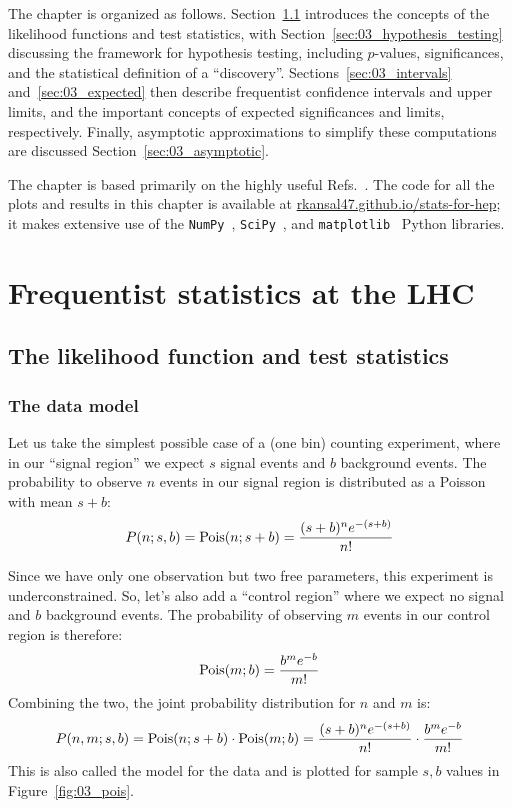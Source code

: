 The chapter is organized as follows.
Section~\ref{sec:03_likelihood} introduces the concepts of the likelihood functions and test statistics, with Section~\ref{sec:03_hypothesis_testing} discussing the framework for hypothesis testing, including $p$-values, significances, and the statistical definition of a ``discovery''.
Sections~\ref{sec:03_intervals} and~\ref{sec:03_expected} then describe frequentist confidence intervals and upper limits, and the important concepts of expected significances and limits, respectively.
Finally, asymptotic approximations to simplify these computations are discussed Section~\ref{sec:03_asymptotic}.

The chapter is based primarily on the highly useful Refs.~\cite{Cowan:2010js, Cranmer:2014lly}.
The code for all the plots and results in this chapter is available at \href{https://rkansal47.github.io/stats-for-hep}{rkansal47.github.io/stats-for-hep}; it makes extensive use of the \texttt{NumPy}~\cite{harris2020array}, \texttt{SciPy}~\cite{2020SciPy-NMeth}, and \texttt{matplotlib}~\cite{Hunter:2007} Python libraries.


\section{Frequentist statistics at the LHC}

\subsection{The likelihood function and test statistics}
\label{sec:03_likelihood}

\subsubsection{The data model}
\label{sec:03_data_model}

Let us take the simplest possible case of a (one bin) counting experiment, where in our ``signal region'' we expect $s$ signal events and $b$ background events.
The probability to observe $n$ events in our signal region is distributed as a Poisson with mean $s+b$:
\begin{equation}
\label{eq:03_poisson}
P(n; s, b) = \mathrm{Pois}(n; s+b) = \frac{(s+b)^n e^{-(s+b)}}{n!}
\end{equation}

Since we have only one observation but two free parameters, this experiment is underconstrained.
So, let's also add a ``control region'' where we expect no signal and $b$ background events.
The probability of observing $m$ events in our control region is therefore:
\begin{equation}
\label{eq:03_pois2}
\mathrm{Pois}(m; b) = \frac{b^m e^{-b}}{m!}
\end{equation}
Combining the two, the joint probability distribution for $n$ and $m$ is:
\begin{equation}
\label{eq:03_pois3}
P(n, m; s, b) = \mathrm{Pois}(n; s+b) \cdot \mathrm{Pois}(m; b) = \frac{(s+b)^n e^{-(s+b)}}{n!} \cdot \frac{b^m e^{-b}}{m!}
\end{equation}
This is also called the model for the data and is plotted for sample $s, b$ values in Figure~\ref{fig:03_pois}.

